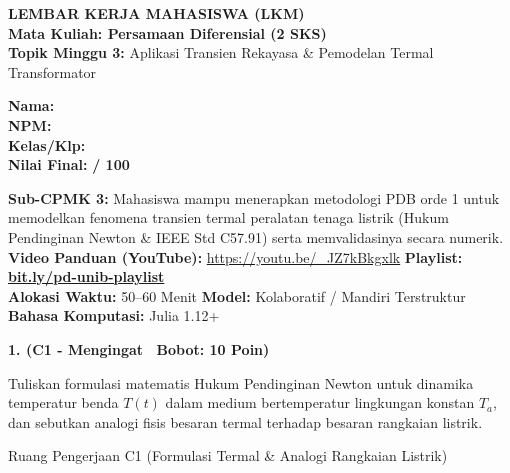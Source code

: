 \documentclass[10pt,a4paper]{article}
\begin{document}
\noindent\begin{minipage}[c]{0.68\textwidth}%
  {\large\textbf{\color{unibblue}LEMBAR KERJA MAHASISWA (LKM)}}\\[1mm]
  {\normalsize\textbf{Mata Kuliah: Persamaan Diferensial (2 SKS)}}\\[0.5mm]
  {\small\textbf{Topik Minggu 3:} Aplikasi Transien Rekayasa \& Pemodelan Termal Transformator}%
\end{minipage}%
\hfill%
\begin{minipage}[c]{0.30\textwidth}%
  \begin{tcolorbox}[colback=unibblue!5,colframe=unibblue,boxrule=0.6pt,arc=2pt,left=4pt,right=4pt,top=2pt,bottom=2pt]
    \scriptsize
    \textbf{Nama:} \dotfill\\[1.2mm]
    \textbf{NPM:} \dotfill\\[1.2mm]
    \textbf{Kelas/Klp:} \dotfill\\[1.2mm]
    \textbf{Nilai Final:} \hfill \textbf{/ 100}
  \end{tcolorbox}%
\end{minipage}\par

\vspace{1.5mm}

\begin{tcolorbox}[colback=boxbg,colframe=unibgold!90!black,boxrule=0.6pt,arc=2pt,left=5pt,right=5pt,top=3pt,bottom=3pt,title=\textbf{\scriptsize Capaian Pembelajaran (Sub-CPMK 3) \& Pedoman Evaluasi OBE}]
  \scriptsize
  \textbf{Sub-CPMK 3:} Mahasiswa mampu menerapkan metodologi PDB orde 1 untuk memodelkan fenomena transien termal peralatan tenaga listrik (Hukum Pendinginan Newton \& IEEE Std C57.91) serta memvalidasinya secara numerik.\\
  \textbf{Video Panduan (YouTube):} \url{https://youtu.be/_JZ7kBkgxlk} \hfill \textbf{Playlist:} \href{https://www.youtube.com/playlist?list=PLS5oOZWXZeTw}{\color{unibblue}\textbf{bit.ly/pd-unib-playlist}}\\\textbf{Alokasi Waktu:} 50--60 Menit \quad\textbar\quad \textbf{Model:} Kolaboratif / Mandiri Terstruktur \quad\textbar\quad \textbf{Bahasa Komputasi:} Julia 1.12+
\end{tcolorbox}

\vspace{1mm}

\noindent\textbf{1. (C1 - Mengingat \textbar\ Bobot: 10 Poin)}\par\vspace{0.5mm}
{\footnotesize Tuliskan formulasi matematis Hukum Pendinginan Newton untuk dinamika temperatur benda $T(t)$ dalam medium bertemperatur lingkungan konstan $T_a$, dan sebutkan analogi fisis besaran termal terhadap besaran rangkaian listrik.}
\begin{answerbox}{Ruang Pengerjaan C1 (Formulasi Termal \& Analogi Rangkaian Listrik)}
  \vspace{2.0cm}
\end{answerbox}
\end{document}
